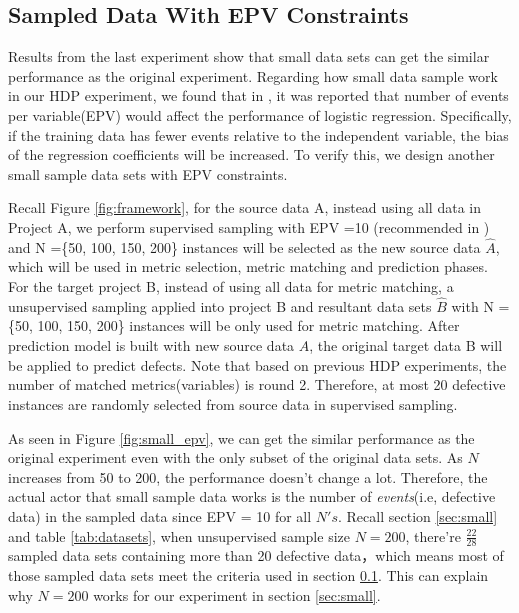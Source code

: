 \subsection{Sampled Data With EPV Constraints}
\label{sec:EPV}
 Results from the last experiment show that small data sets can get the similar performance as the original experiment. Regarding how small data sample work in our HDP experiment,  we found that in \cite{peduzzi1996simulation}, it was reported that number of events per variable(EPV) would affect the performance of logistic regression. Specifically, if the training data has fewer events relative to the independent variable, the bias of the regression coefficients will be increased. To verify this, we design another small sample data sets with EPV constraints.

Recall Figure \ref{fig:framework}, for the source data A, instead using all data in Project A, we perform supervised sampling with EPV =10 (recommended in \cite{peduzzi1996simulation})  and N =\{50, 100, 150, 200\} instances will be selected as the new source data ${\hat A}$, which will be used in metric selection, metric matching and prediction phases. For the target project B, instead of using all data for metric matching, a unsupervised sampling applied into project B and resultant data sets ${\hat B}$ with N = \{50, 100, 150, 200\} instances will be only used for metric matching. After prediction model is built with new source data $\hat A$, the original target data B will be applied to predict defects. Note that based on previous HDP experiments, the number of matched metrics(variables) is round 2. Therefore, at most 20 defective instances are randomly selected from source data in supervised sampling.

As seen in Figure \ref{fig:small_epv}, we can get the similar performance as the original experiment even with the only subset of the original data sets. As $N$ increases from 50 to 200, the performance doesn't change a lot. Therefore, the actual actor that small sample data works is the number of {\it events}(i.e, defective data) in the sampled data since EPV = 10 for all $N's$. Recall section \ref{sec:small} and table \ref{tab:datasets}, when unsupervised sample size $N=200$, there're $\frac{22}{28}$ sampled data sets containing more than 20 defective data，which means most of those sampled data sets meet the criteria used in section \ref{sec:EPV}. This can explain why $N=200$ works for our experiment in section \ref{sec:small}.




